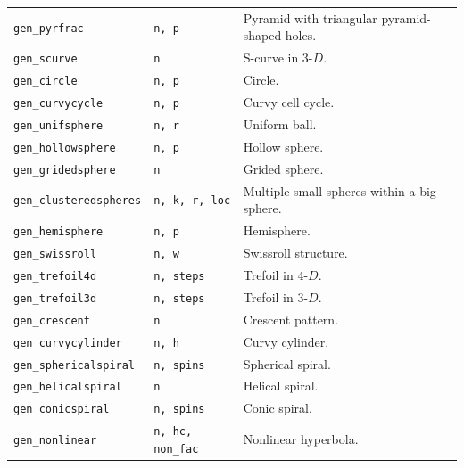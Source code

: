 \begin{table}
\begin{tabular}[t]{>{\raggedright\arraybackslash}p{3.5cm}>{\raggedright\arraybackslash}p{1.5cm}>{\raggedright\arraybackslash}p{8cm}}
\texttt{gen\_pyrfrac} & \texttt{n, p} & Pyramid with triangular pyramid-shaped holes.\\
\texttt{gen\_scurve} & \texttt{n} & S-curve in $3\text{-}D$.\\
\texttt{gen\_circle} & \texttt{n, p} & Circle.\\
\texttt{gen\_curvycycle} & \texttt{n, p} & Curvy cell cycle.\\
\texttt{gen\_unifsphere} & \texttt{n, r} & Uniform ball.\\
\texttt{gen\_hollowsphere} & \texttt{n, p} & Hollow sphere.\\
\texttt{gen\_gridedsphere} & \texttt{n} & Grided sphere.\\
\texttt{gen\_clusteredspheres} & \texttt{n, k, r, loc} & Multiple small spheres within a big sphere.\\
\texttt{gen\_hemisphere} & \texttt{n, p} & Hemisphere.\\
\texttt{gen\_swissroll} & \texttt{n, w} & Swissroll structure.\\
\texttt{gen\_trefoil4d} & \texttt{n, steps} & Trefoil in $4\text{-}D$.\\
\texttt{gen\_trefoil3d} & \texttt{n, steps} & Trefoil in $3\text{-}D$.\\
\texttt{gen\_crescent} & \texttt{n} & Crescent pattern.\\
\texttt{gen\_curvycylinder} & \texttt{n, h} & Curvy cylinder.\\
\texttt{gen\_sphericalspiral} & \texttt{n, spins} & Spherical spiral.\\
\texttt{gen\_helicalspiral} & \texttt{n} & Helical spiral.\\
\texttt{gen\_conicspiral} & \texttt{n, spins} & Conic spiral.\\
\texttt{gen\_nonlinear} & \texttt{n, hc, non\_fac} & Nonlinear hyperbola.\\
\bottomrule
\end{tabular}
\end{table}

